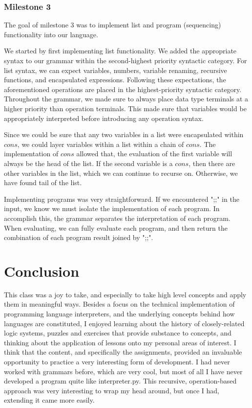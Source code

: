 \documentclass{article}
\theoremstyle{theorem}
\theoremstyle{definition}
\theoremstyle{remark}
\begin{document}
\subsubsection{Milestone 3}

The goal of milestone 3 was to implement list and program (sequencing) functionality into our language.

We started by first implementing list functionality. We added the appropriate syntax to our grammar within the second-highest priority syntactic category. For list syntax, we can expect variables, numbers, variable renaming, recursive functions, and encapsulated expressions. Following these expectations, the aforementioned operations are placed in the highest-priority syntactic category. Throughout the grammar, we made sure to always place data type terminals at a higher priority than operation terminals. This made sure that variables would be appropriately interpreted before introducing any operation syntax.

Since we could be sure that any two variables in a list were encapsulated within $cons$, we could layer variables within a list within a chain of $cons$. The implementation of $cons$ allowed that, the evaluation of the first variable will always be the head of the list. If the second variable is a $cons$, then there are other variables in the list, which we can continue to recurse on. Otherwise, we have found tail of the list.

Implementing programs was very straightforward. If we encountered ";;" in the input, we know we must isolate the implementation of each program. In accomplish this, the grammar separates the interpretation of each program. When evaluating, we can fully evaluate each program, and then return the combination of each program result joined by ";;".

\section{Conclusion}\label{conclusion}

This class was a joy to take, and especially to take high level concepts and apply them in meaningful ways. Besides a focus on the technical implementation of programming language interpreters, and the underlying concepts behind how languages are constituted, I enjoyed learning about the history of closely-related logic systems, puzzles and exercises that provide substance to concepts, and thinking about the application of lessons onto my personal areas of interest. I think that the content, and specifically the assignments, provided an invaluable opportunity to practice a very interesting form of development. I had never worked with grammars before, which are very cool, but most of all I have never developed a program quite like interpreter.py. This recursive, operation-based approach was very interesting to wrap my head around, but once I had, extending it came more easily. 
\end{document}
